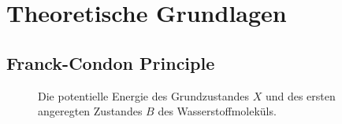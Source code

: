 \chapter{Theoretische Grundlagen} \label{sec:theorie}

\section{Franck-Condon Principle}

\begin{figure}[tbhp]
    \centering
    
    \caption{Die potentielle Energie des Grundzustandes $X$ und des ersten angeregten Zustandes $B$ des Wasserstoffmoleküls.}
    \label{fig:potentielle_Energie_X_und_B}
\end{figure}



